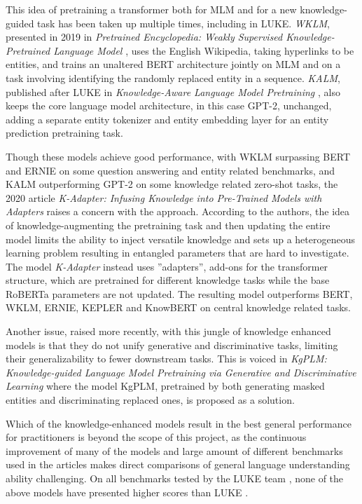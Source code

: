 \documentclass[main.tex]{subfiles}
\begin{document}
This idea of pretraining a transformer both for MLM and for a new knowledge-guided task has been taken up multiple times, including in LUKE.
\emph{WKLM}, presented in 2019 in \emph{Pretrained Encyclopedia: Weakly Supervised Knowledge-Pretrained Language Model} \cite{xiong2019wklm}, uses the English Wikipedia, taking hyperlinks to be entities, and trains an unaltered BERT architecture jointly on MLM and on a task involving identifying the randomly replaced entity in a sequence.
\emph{KALM}, published after LUKE in \emph{Knowledge-Aware Language Model Pretraining} \cite{corby2020kalm}, also keeps the core language model architecture, in this case GPT-2, unchanged, adding a separate entity tokenizer and entity embedding layer for an entity prediction pretraining task.

Though these models achieve good performance, with WKLM surpassing BERT and ERNIE on some question answering and entity related benchmarks, and KALM outperforming GPT-2 on some knowledge related zero-shot tasks, the 2020 article \emph{K-Adapter: Infusing Knowledge into Pre-Trained Models with Adapters} \cite{wang2020kadapter} raises a concern with the approach.
According to the authors, the idea of knowledge-augmenting the pretraining task and then updating the entire model limits the ability to inject versatile knowledge and sets up a heterogeneous learning problem resulting in entangled parameters that are hard to investigate.
The model \emph{K-Adapter} instead uses ''adapters'', add-ons for the transformer structure, which are pretrained for different knowledge tasks while the base RoBERTa parameters are not updated.
The resulting model outperforms BERT, WKLM, ERNIE, KEPLER and KnowBERT on central knowledge related tasks.

Another issue, raised more recently, with this jungle of knowledge enhanced models is that they do not unify generative and discriminative tasks, limiting their generalizability to fewer downstream tasks.
This is voiced in \emph{KgPLM: Knowledge-guided Language Model Pretraining via Generative and Discriminative Learning} \cite{he2020kgplm} where the model KgPLM, pretrained by both generating masked entities and discriminating replaced ones, is proposed as a solution.

Which of the knowledge-enhanced models result in the best general performance for practitioners is beyond the scope of this project, as the continuous improvement of many of the models and large amount of different benchmarks used in the articles makes direct comparisons of general language understanding ability challenging.
On all benchmarks tested by the LUKE team \cite{yamada2020luke}, none of the above models have presented higher scores than LUKE \cite[Sec. 4]{yamada2020luke}.
\end{document}

